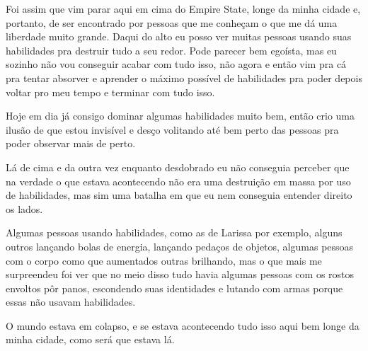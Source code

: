 Foi assim que vim parar aqui em cima do Empire State, longe da minha cidade e, portanto, de ser encontrado por pessoas que me conheçam o que me dá uma liberdade muito grande. Daqui do alto eu posso ver muitas pessoas usando suas habilidades pra destruir tudo a seu redor. Pode parecer bem egoísta, mas eu sozinho não vou conseguir acabar com tudo isso, não agora e então vim pra cá pra tentar absorver e aprender o máximo possível de habilidades pra poder depois voltar pro meu tempo e terminar com tudo isso.

Hoje em dia já consigo dominar algumas habilidades muito bem, então crio uma ilusão de que estou invisível e desço volitando até bem perto das pessoas pra poder observar mais de perto.

Lá de cima e da outra vez enquanto desdobrado eu não conseguia perceber que na verdade o que estava acontecendo não era uma destruição em massa por uso de habilidades, mas sim uma batalha em que eu nem conseguia entender direito os lados.

Algumas pessoas usando habilidades, como as de Larissa por exemplo, alguns outros lançando bolas de energia, lançando pedaços de objetos, algumas pessoas com o corpo como que aumentados outras brilhando, mas o que mais me surpreendeu foi ver que no meio disso tudo havia algumas pessoas com os rostos envoltos pôr panos, escondendo suas identidades e lutando com armas porque essas não usavam habilidades.

O mundo estava em colapso, e se estava acontecendo tudo isso aqui bem longe da minha cidade, como será que estava lá.

